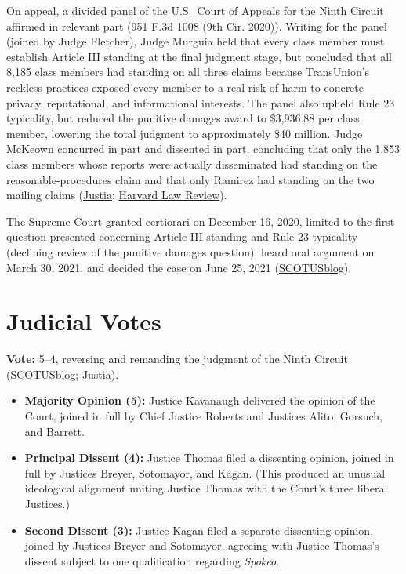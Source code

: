 \documentclass[12pt]{article}
\begin{document}
On appeal, a divided panel of the U.S.~Court of Appeals for the Ninth Circuit affirmed in relevant part (951 F.3d 1008 (9th Cir. 2020)). Writing for the panel (joined by Judge Fletcher), Judge Murguia held that every class member must establish Article III standing at the final judgment stage, but concluded that all 8,185 class members had standing on all three claims because TransUnion's reckless practices exposed every member to a real risk of harm to concrete privacy, reputational, and informational interests. The panel also upheld Rule 23 typicality, but reduced the punitive damages award to \$3,936.88 per class member, lowering the total judgment to approximately \$40 million. Judge McKeown concurred in part and dissented in part, concluding that only the 1,853 class members whose reports were actually disseminated had standing on the reasonable-procedures claim and that only Ramirez had standing on the two mailing claims (\href{https://supreme.justia.com/cases/federal/us/594/20-297/}{Justia}; \href{https://harvardlawreview.org/print/vol-135/transunion-v-ramirez/}{Harvard Law Review}).

The Supreme Court granted certiorari on December 16, 2020, limited to the first question presented concerning Article III standing and Rule 23 typicality (declining review of the punitive damages question), heard oral argument on March 30, 2021, and decided the case on June 25, 2021 (\href{https://www.scotusblog.com/cases/transunion-llc-v-ramirez/}{SCOTUSblog}).

\section{Judicial Votes}

\textbf{Vote:} 5--4, reversing and remanding the judgment of the Ninth Circuit (\href{https://www.scotusblog.com/cases/transunion-llc-v-ramirez/}{SCOTUSblog}; \href{https://supreme.justia.com/cases/federal/us/594/20-297/}{Justia}).

\begin{itemize}
\item \textbf{Majority Opinion (5):} Justice Kavanaugh delivered the opinion of the Court, joined in full by Chief Justice Roberts and Justices Alito, Gorsuch, and Barrett.
\item \textbf{Principal Dissent (4):} Justice Thomas filed a dissenting opinion, joined in full by Justices Breyer, Sotomayor, and Kagan. (This produced an unusual ideological alignment uniting Justice Thomas with the Court's three liberal Justices.)
\item \textbf{Second Dissent (3):} Justice Kagan filed a separate dissenting opinion, joined by Justices Breyer and Sotomayor, agreeing with Justice Thomas's dissent subject to one qualification regarding \textit{Spokeo}.
\end{itemize}
\end{document}
